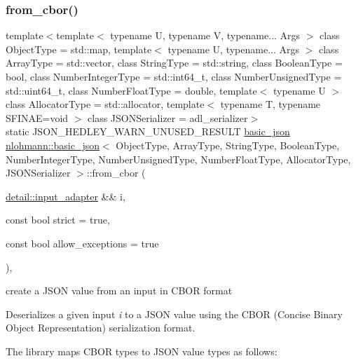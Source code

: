 \subsubsection{\texorpdfstring{from\+\_\+cbor()}{from\_cbor()}\hspace{0.1cm}{\footnotesize\ttfamily [1/2]}}
{\footnotesize\ttfamily template$<$template$<$ typename U, typename V, typename... Args $>$ class Object\+Type = std\+::map, template$<$ typename U, typename... Args $>$ class Array\+Type = std\+::vector, class String\+Type  = std\+::string, class Boolean\+Type  = bool, class Number\+Integer\+Type  = std\+::int64\+\_\+t, class Number\+Unsigned\+Type  = std\+::uint64\+\_\+t, class Number\+Float\+Type  = double, template$<$ typename U $>$ class Allocator\+Type = std\+::allocator, template$<$ typename T, typename S\+F\+I\+N\+A\+E=void $>$ class J\+S\+O\+N\+Serializer = adl\+\_\+serializer$>$ \\
static J\+S\+O\+N\+\_\+\+H\+E\+D\+L\+E\+Y\+\_\+\+W\+A\+R\+N\+\_\+\+U\+N\+U\+S\+E\+D\+\_\+\+R\+E\+S\+U\+LT \mbox{\hyperlink{classnlohmann_1_1basic__json}{basic\+\_\+json}} \mbox{\hyperlink{classnlohmann_1_1basic__json}{nlohmann\+::basic\+\_\+json}}$<$ Object\+Type, Array\+Type, String\+Type, Boolean\+Type, Number\+Integer\+Type, Number\+Unsigned\+Type, Number\+Float\+Type, Allocator\+Type, J\+S\+O\+N\+Serializer $>$\+::from\+\_\+cbor (\begin{DoxyParamCaption}\item[{\mbox{\hyperlink{classnlohmann_1_1detail_1_1input__adapter}{detail\+::input\+\_\+adapter}} \&\&}]{i,  }\item[{const bool}]{strict = {\ttfamily true},  }\item[{const bool}]{allow\+\_\+exceptions = {\ttfamily true} }\end{DoxyParamCaption})\hspace{0.3cm}{\ttfamily [inline]}, {\ttfamily [static]}}



create a J\+S\+ON value from an input in C\+B\+OR format 

Deserializes a given input {\itshape i} to a J\+S\+ON value using the C\+B\+OR (Concise Binary Object Representation) serialization format.

The library maps C\+B\+OR types to J\+S\+ON value types as follows\+:

